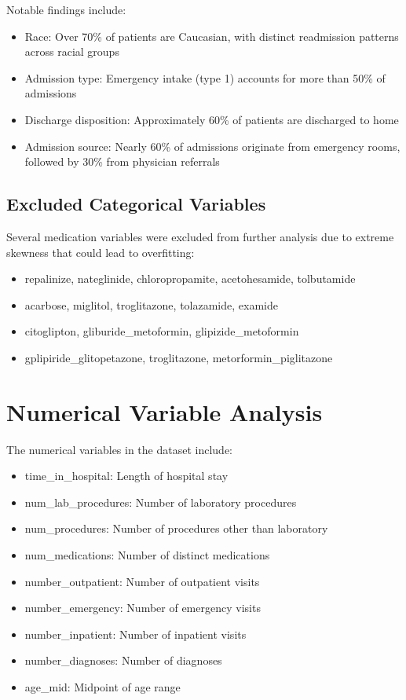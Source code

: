 Notable findings include:
\begin{itemize}
    \item Race: Over 70\% of patients are Caucasian, with distinct readmission patterns across racial groups
    \item Admission type: Emergency intake (type 1) accounts for more than 50\% of admissions
    \item Discharge disposition: Approximately 60\% of patients are discharged to home
    \item Admission source: Nearly 60\% of admissions originate from emergency rooms, followed by 30\% from physician referrals
\end{itemize}



\subsection{Excluded Categorical Variables}

Several medication variables were excluded from further analysis due to extreme skewness that could lead to overfitting:
\begin{itemize}
    \item repalinize, nateglinide, chloropropamite, acetohesamide, tolbutamide
    \item acarbose, miglitol, troglitazone, tolazamide, examide
    \item citoglipton, gliburide\_metoformin, glipizide\_metoformin
    \item gplipiride\_glitopetazone, troglitazone, metorformin\_piglitazone
\end{itemize}

\section{Numerical Variable Analysis}

The numerical variables in the dataset include:
\begin{itemize}
    \item time\_in\_hospital: Length of hospital stay
    \item num\_lab\_procedures: Number of laboratory procedures
    \item num\_procedures: Number of procedures other than laboratory
    \item num\_medications: Number of distinct medications
    \item number\_outpatient: Number of outpatient visits
    \item number\_emergency: Number of emergency visits
    \item number\_inpatient: Number of inpatient visits
    \item number\_diagnoses: Number of diagnoses
    \item age\_mid: Midpoint of age range
\end{itemize}

